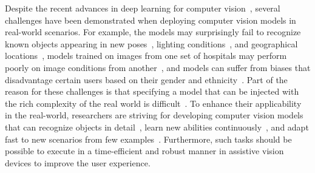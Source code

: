 Despite the recent advances in deep learning for computer vision~\cite{krizhevsky2012imagenet,he2016deep, redmon2017yolo9000,xu2015show,anderson2018bottom}, several challenges have been demonstrated when deploying computer vision models in real-world scenarios. For example, the models may surprisingly fail to recognize known objects appearing in new poses~\cite{alcorn2019strike}, lighting conditions~\cite{dai2018dark}, and geographical locations~\cite{de2019does}, models trained on images from one set of hospitals may perform poorly on image conditions from another~\cite{koh2021wilds}, and models can suffer from biases that disadvantage certain users based on their gender and ethnicity~\cite{buolamwini2018gender}. Part of the reason for these challenges is that specifying a model that can be injected with the rich complexity of the real world is difficult~\cite{szeliski2010computer}. 
To enhance their applicability in the real-world, researchers are striving for developing computer vision models that can recognize objects in detail~\cite{wei2021fine}, learn new abilities continuously~\cite{delange2021continual,parisi2019continual}, and adapt fast to new scenarios from few examples~\cite{wang2020generalizing,xian2018zero,hospedales2020meta}. Furthermore, such tasks should be possible to execute in a time-efficient and robust manner in assistive vision devices to improve the user experience.  



